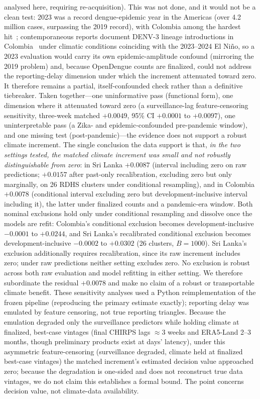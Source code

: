 \documentclass[11pt,a4paper]{article}
\begin{document}
analysed here, requiring re-acquisition). This was not done, and it would not be a clean test: 2023 was a record dengue-epidemic year in the Americas (over 4.2 million cases, surpassing the 2019 record), with Colombia among the hardest hit~\cite{PAHO2023}; contemporaneous reports document DENV-3 lineage introductions in Colombia~\cite{ValleDelCauca2024} under climatic conditions coinciding with the 2023--2024 El Ni\~no, so a 2023 evaluation would carry its own epidemic-amplitude confound (mirroring the 2019 problem) and, because OpenDengue counts are finalized, could not address the reporting-delay dimension under which the increment attenuated toward zero. It therefore remains a partial, itself-confounded check rather than a definitive tiebreaker. Taken together---one uninformative pass (functional form), one dimension where it attenuated toward zero (a surveillance-lag feature-censoring sensitivity, three-week matched $+0.0049$, 95\% CI $+0.0001$ to $+0.0097$), one uninterpretable pass (a Zika- and epidemic-confounded pre-pandemic window), and one missing test (post-pandemic)---the evidence does not support a robust climate increment. The single conclusion the data support is that, \emph{in the two settings tested, the matched climate increment was small and not robustly distinguishable from zero}: in Sri Lanka $+0.0087$ (interval including zero on raw predictions; $+0.0157$ after past-only recalibration, excluding zero but only marginally, on 26 RDHS clusters under conditional resampling), and in Colombia $+0.0078$ (conditional interval excluding zero but development-inclusive interval including it), the latter under finalized counts and a pandemic-era window. Both nominal exclusions hold only under conditional resampling and dissolve once the models are refit: Colombia's conditional exclusion becomes development-inclusive $-0.0001$ to $+0.0244$, and Sri Lanka's recalibrated conditional exclusion becomes development-inclusive $-0.0002$ to $+0.0302$ (26 clusters, $B=1000$). Sri Lanka's exclusion additionally requires recalibration, since its raw increment includes zero; under raw predictions neither setting excludes zero. No exclusion is robust across both raw evaluation and model refitting in either setting. We therefore subordinate the residual $+0.0078$ and make no claim of a robust or transportable climate benefit. These sensitivity analyses used a Python reimplementation of the frozen pipeline (reproducing the primary estimate exactly); reporting delay was emulated by feature censoring, not true reporting triangles. Because the emulation degraded only the surveillance predictors while holding climate at finalized, best-case vintages (final CHIRPS lags $\approx$3 weeks and ERA5-Land 2--3 months, though preliminary products exist at days' latency), under this asymmetric feature-censoring (surveillance degraded, climate held at finalized best-case vintages) the matched increment's estimated decision value approached zero; because the degradation is one-sided and does not reconstruct true data vintages, we do not claim this establishes a formal bound. The point concerns decision value, not climate-data availability.
\end{document}
